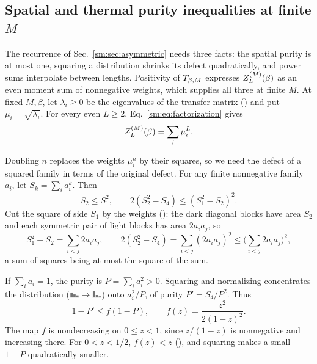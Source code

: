 \subsection{Spatial and thermal purity inequalities at finite $M$}
\label{sm:sec:moments}

The recurrence of Sec.~\ref{sm:sec:asymmetric} needs three facts: the
spatial purity is at most one, squaring a distribution shrinks its
defect quadratically, and power sums interpolate between lengths.
Positivity of $T_{\beta,M}$ expresses $Z_{L}^{(M)}(\beta)$ as an even moment sum of
nonnegative weights, which supplies all three at finite $M$.
At fixed $M,\beta$, let $\lambda_i\ge0$ be the eigenvalues of the
transfer matrix () and put
$\mu_i=\sqrt{\lambda_i}$.
For every even $L\ge2$, Eq.~\eqref{sm:eq:factorization} gives
\begin{equation}
    Z_{L}^{(M)}(\beta)=\sum_i\mu_i^L.
    \label{sm:eq:moments}
\end{equation}

Doubling $n$ replaces the weights $\mu_i^n$ by their squares, so we
need the defect of a squared family in terms of the original defect.
For any finite nonnegative family $a_i$, let $S_k=\sum_i a_i^k$.
Then%
~
\begin{equation}
    S_2\le S_1^2,\qquad
    2(S_2^2-S_4)\le(S_1^2-S_2)^2.
    \label{sm:eq:powers}
\end{equation}
Cut the square of side $S_1$ by the weights (\pairsquare): the
dark diagonal blocks have area $S_2$ and each symmetric pair of light
blocks has area $2a_ia_j$, so
\[
    S_1^2-S_2=\sum_{i<j}2a_ia_j,\qquad
    2(S_2^2-S_4)=\sum_{i<j}(2a_ia_j)^2\le\Big(\sum_{i<j}2a_ia_j\Big)^2,
\]
a sum of squares being at most the square of the sum.

If $\sum_i a_i=1$, the purity is $P=\sum_i a_i^2>0$.
Squaring and normalizing concentrates the distribution
($\specbars[black!55]{.5,.3,.2}\mapsto\specbars[black!55]{.66,.24,.1}$)
onto $a_i^2/P$, of purity $P'=S_4/P^2$. Thus%
~
\begin{equation}
    1-P'\le f(1-P),\qquad
    f(z)=\frac{z^2}{2(1-z)^2}.
    \label{sm:eq:squaring}
\end{equation}
The map $f$ is nondecreasing on $0\le z<1$, since
$z/(1-z)$ is nonnegative and increasing there. For $0<z<1/2$,
$f(z)<z$ (\fbelowdiag), and squaring makes a small $1-P$ quadratically
smaller.

